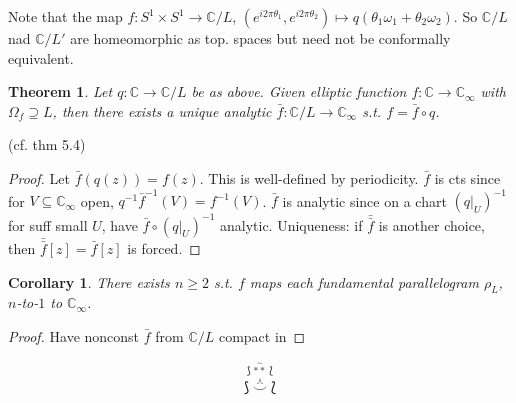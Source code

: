 \documentclass{article}
\theoremstyle{definition}
\theoremstyle{remark}
\theoremstyle{plain}
\newtheorem{thm}[defn]{Theorem}
\newtheorem{crly}[defn]{Corollary}
\newcommand{\CC}{\mathbb{C}}
\begin{document}
Note that the map $f:S^1\times S^1\to \CC/L$, $(e^{i2\pi \theta_1},e^{i2\pi\theta_2})\mapsto q(\theta_1\omega_1+\theta_2\omega_2)$. So $\CC/L$ nad $\CC/L'$ are homeomorphic as top. spaces but need not be conformally equivalent.
\begin{thm}
    Let $q:\CC\to\CC/L$ be as above. Given elliptic function $f:\CC\to\CC_\infty$ with $\Omega_f\supseteq L$, then there exists a unique analytic $\bar f:\CC/L\to\CC_\infty$ s.t. $f=\bar f\circ q$.
\end{thm}
(cf. thm 5.4)
\begin{proof}
    Let $\bar f(q(z))=f(z)$. This is well-defined by periodicity. $\bar f$ is cts since for $V\subseteq \CC_\infty$ open, $q^{-1}\bar f^{-1}(V)=f^{-1}(V)$. $\bar f$ is analytic since on a chart $(q|_U)^{-1}$ for suff small $U$, have $\bar f\circ (q|_U)^{-1}$ analytic. Uniqueness: if $\bar{\bar f}$ is another choice, then $\bar{\bar f}[z]=\bar f[z]$ is forced.
\end{proof}
\begin{crly}
    There exists $n\ge 2$ s.t. $f$ maps each fundamental parallelogram $\rho_L$, $n$-to-$1$ to $\CC_\infty$.
\end{crly}
\begin{proof}
    Have nonconst $\bar f$ from $\CC/L$ compact in
\end{proof}
\[\overset{\Rbag\overset{\sim}{**}\Lbag}{\Rbag\overset{\curlywedge}{\smile}\Lbag}\tag{Owen's Signature}\]
\end{document}

